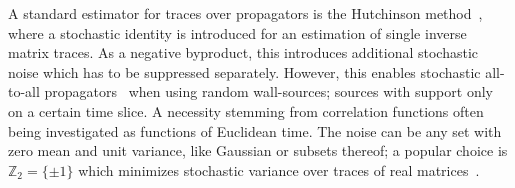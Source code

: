 
A standard estimator for traces over propagators is the Hutchinson method~\cite{Hutchinson01011990}, where a stochastic identity is introduced for an estimation of single inverse matrix traces.
As a negative byproduct, this introduces additional stochastic noise which has to be suppressed separately.
However, this enables stochastic all-to-all propagators~\cite{Foley:2005ac} when using random wall-sources; sources with support only on a certain time slice.
A necessity stemming from correlation functions often being investigated as functions of Euclidean time.
The noise can be any set with zero mean and unit variance, like Gaussian or subsets thereof; a popular choice is $\mathbb{Z}_2 = \{\pm 1\}$ which minimizes stochastic variance over traces of real matrices~\cite{Bernardson:1993he}.

